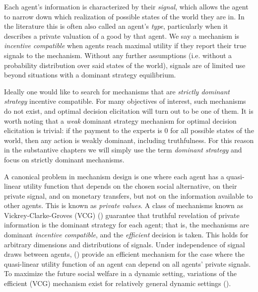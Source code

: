 Each agent's information is characterized by their \emph{signal}, which allows the agent to narrow down which realization of possible states of the world they are in. In the literature this is often also called an agent's \emph{type}, particularly when it describes a private valuation of a good by that agent.
We say a mechanism is \emph{incentive compatible} when agents reach maximal utility if they report their true signals to the mechanism. 
Without any further assumptions (i.e. without a probability distribution over said states of the world), signals are of limited use beyond situations with a dominant strategy equilibrium.

Ideally one would like to search for mechanisms that are \emph{strictly dominant strategy} incentive compatible. %
For many objectives of interest, such mechanisms do not exist, and optimal decision elicitation will turn out to be one of them.
It is worth noting that a \emph{weak} dominant strategy mechanism for optimal decision elicitation is trivial: if the payment to the experts is 0 for all possible states of the world, then any action is weakly dominant, including truthfulness. 
For this reason in the substantive chapters we will simply use the term \emph{dominant strategy} and focus on strictly dominant mechanisms. 

A canonical problem in mechanism design is one where each agent has a quasi-linear utility function that depends on the chosen social alternative, on their private signal, and on monetary transfers, but not on the information available to other agents.
This is known as \emph{private values}.
A class of mechanisms known as Vickrey-Clarke-Groves (VCG)  (\cite{vickrey1961,clarke1971,groves1973}) guarantee that truthful revelation of private information is the dominant strategy for each agent; that is, the mechanisms are dominant \emph{incentive compatible}, and the \emph{efficient} decision is taken. 
This holds for arbitrary dimensions and distributions of signals.
Under independence of signal draws between agents, (\cite{jehiel2001efficient}) provide an efficient mechanism for the case where the quasi-linear utility function of an agent can depend on all agents' private signals. 
To maximize the future social welfare in a dynamic setting, variations of the efficient (VCG) mechanism exist for relatively general dynamic settings (\cite{bergemann2010dynamic,parkes2003van,athey2007designing}).

